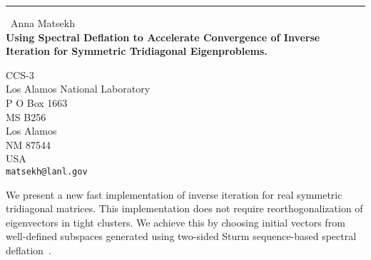\documentclass{report}
\begin{document}
\begin{center}
\rule{6in}{1pt} \
{\large Anna Matsekh \\
{\bf Using Spectral Deflation to Accelerate Convergence of Inverse Iteration for Symmetric Tridiagonal Eigenproblems.}}

CCS-3 \\ Los Alamos National Laboratory \\ P O Box 1663 \\ MS B256 \\ Los Alamos \\ NM 87544 \\ USA
\\
{\tt matsekh@lanl.gov}\end{center}

We present a new fast implementation of inverse iteration for
real symmetric tridiagonal matrices. This implementation does not
require reorthogonalization of eigenvectors in tight clusters.
We achieve this by choosing initial vectors from well-defined
subspaces generated using two-sided Sturm sequence-based spectral
deflation~\cite{garant:eng}.
\end{document}
